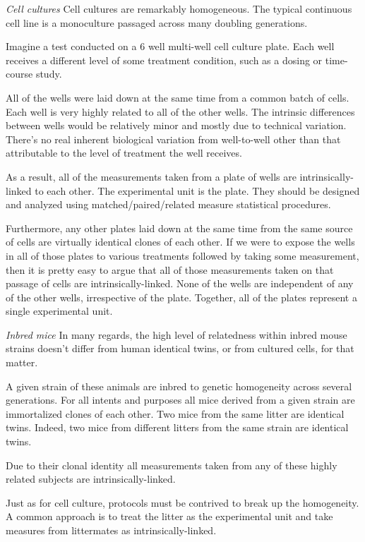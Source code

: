 \documentclass[]{book}
\begin{document}
\emph{Cell cultures} Cell cultures are remarkably homogeneous. The typical continuous cell line is a monoculture passaged across many doubling generations.

Imagine a test conducted on a 6 well multi-well cell culture plate. Each well receives a different level of some treatment condition, such as a dosing or time-course study.

All of the wells were laid down at the same time from a common batch of cells. Each well is very highly related to all of the other wells. The intrinsic differences between wells would be relatively minor and mostly due to technical variation. There's no real inherent biological variation from well-to-well other than that attributable to the level of treatment the well receives.

As a result, all of the measurements taken from a plate of wells are intrinsically-linked to each other. The experimental unit is the plate. They should be designed and analyzed using matched/paired/related measure statistical procedures.

Furthermore, any other plates laid down at the same time from the same source of cells are virtually identical clones of each other. If we were to expose the wells in all of those plates to various treatments followed by taking some measurement, then it is pretty easy to argue that all of those measurements taken on that passage of cells are intrinsically-linked. None of the wells are independent of any of the other wells, irrespective of the plate. Together, all of the plates represent a single experimental unit.

\emph{Inbred mice} In many regards, the high level of relatedness within inbred mouse strains doesn't differ from human identical twins, or from cultured cells, for that matter.

A given strain of these animals are inbred to genetic homogeneity across several generations. For all intents and purposes all mice derived from a given strain are immortalized clones of each other. Two mice from the same litter are identical twins. Indeed, two mice from different litters from the same strain are identical twins.

Due to their clonal identity all measurements taken from any of these highly related subjects are intrinsically-linked.

Just as for cell culture, protocols must be contrived to break up the homogeneity. A common approach is to treat the litter as the experimental unit and take measures from littermates as intrinsically-linked.
\end{document}

